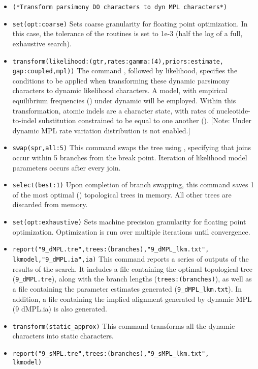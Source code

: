 \begin{itemize}
\item \texttt{(*Transform parsimony DO characters to dyn MPL
characters*)} 
\item \texttt{set(opt:coarse)} Sets coarse granularity
for floating point optimization. In this case, the tolerance of the
routines is set to 1e-3 (half the log of a full, exhaustive search).
\item \texttt{transform(likelihood:(gtr,rates:gamma:(4),priors:estimate,\\gap:coupled,mpl))}
The command , followed by \poyargument
{likelihood}, specifies the conditions to be applied when transforming
these dynamic parsimony characters to dynamic likelihood characters.
A  model, with empirical equilibrium frequencies
() under dynamic 
will be employed. Within this transformation, atomic indels are a
character state, with rates of nucleotide-to-indel substitution
constrained to be equal to one another ().
[Note: Under dynamic MPL rate variation distribution is not enabled.]
\item \texttt{swap(spr,all:5)} This command swaps the tree using
, specifying that joins occur within 5 branches
from the break point. Iteration of likelihood model parameters
occurs after every join.  
\item \texttt{select(best:1)} Upon completion of branch swapping, 
this command saves 1 of the most optimal () 
topological trees in memory. All other trees are discarded from memory.  
\item \texttt{set(opt:exhaustive)} Sets machine precision granularity 
for floating point optimization. Optimization is run over multiple 
iterations until convergence.
\item \texttt{report("9\_dMPL.tre",trees:(branches),"9\_dMPL\_lkm.txt",\\lkmodel,"9\_dMPL.ia",ia)}
This command reports a series of outputs of the results of the
search.  It includes a file containing the optimal topological
tree (\texttt{9\_dMPL.tre}), along with the branch lengths
(\texttt{trees:(branches)}), as well as a file containing the
parameter estimates generated (\texttt{9\_dMPL\_lkm.txt}).  In
addition, a file containing the implied alignment generated by
dynamic MPL (9 dMPL.ia) is also generated.  
\item \texttt{transform(static\_approx)} This command transforms all the
dynamic characters into static characters.  
\item \texttt{report("9\_sMPL.tre",trees:(branches),"9\_sMPL\_lkm.txt",\\lkmodel)}

\end{itemize}
